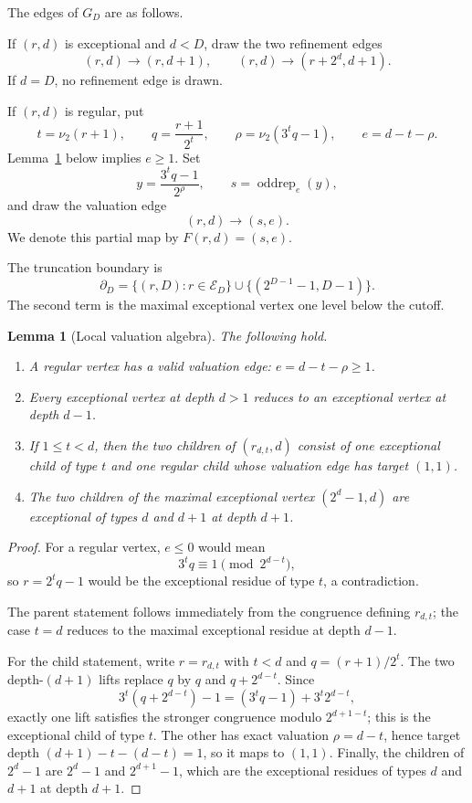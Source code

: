 \documentclass[11pt]{article}
\newtheorem{lemma}[theorem]{Lemma}
\theoremstyle{definition}
\theoremstyle{remark}
\newcommand{\nuu}{\nu_2}
\newcommand{\Ecal}{\mathcal E}
\newcommand{\bdD}{\partial_D}
\newcommand{\oddrep}{\operatorname{oddrep}}
\begin{document}
The edges of $G_D$ are as follows.

If $(r,d)$ is exceptional and $d<D$, draw the two refinement edges
\[
(r,d)\to(r,d+1),\qquad (r,d)\to(r+2^d,d+1).
\]
If $d=D$, no refinement edge is drawn.

If $(r,d)$ is regular, put
\[
t=\nuu(r+1),\qquad q=\frac{r+1}{2^t},\qquad
\rho=\nuu(3^tq-1),\qquad e=d-t-\rho.
\]
Lemma~\ref{lem:local} below implies $e\ge1$.  Set
\[
y=\frac{3^tq-1}{2^\rho},\qquad s=\oddrep_e(y),
\]
and draw the valuation edge
\[
(r,d)\to(s,e).
\]
We denote this partial map by $F(r,d)=(s,e)$.

The truncation boundary is
\[
\bdD=\{(r,D):r\in\Ecal_D\}\cup\{(2^{D-1}-1,D-1)\}.
\]
The second term is the maximal exceptional vertex one level below the cutoff.

\begin{lemma}[Local valuation algebra]\label{lem:local}
The following hold.
\begin{enumerate}
\item A regular vertex has a valid valuation edge: $e=d-t-\rho\ge1$.
\item Every exceptional vertex at depth $d>1$ reduces to an exceptional vertex at depth $d-1$.
\item If $1\le t<d$, then the two children of $(r_{d,t},d)$ consist of one exceptional child of type $t$ and one regular child whose valuation edge has target $(1,1)$.
\item The two children of the maximal exceptional vertex $(2^d-1,d)$ are exceptional of types $d$ and $d+1$ at depth $d+1$.
\end{enumerate}
\end{lemma}

\begin{proof}
For a regular vertex, $e\le0$ would mean
\[
3^tq\equiv1\pmod {2^{d-t}},
\]
so $r=2^tq-1$ would be the exceptional residue of type $t$, a contradiction.

The parent statement follows immediately from the congruence defining $r_{d,t}$; the case $t=d$ reduces to the maximal exceptional residue at depth $d-1$.

For the child statement, write $r=r_{d,t}$ with $t<d$ and $q=(r+1)/2^t$.  The two depth-$(d+1)$ lifts replace $q$ by $q$ and $q+2^{d-t}$.  Since
\[
3^t(q+2^{d-t})-1=(3^tq-1)+3^t2^{d-t},
\]
exactly one lift satisfies the stronger congruence modulo $2^{d+1-t}$; this is the exceptional child of type $t$.  The other has exact valuation $\rho=d-t$, hence target depth $(d+1)-t-(d-t)=1$, so it maps to $(1,1)$.  Finally, the children of $2^d-1$ are $2^d-1$ and $2^{d+1}-1$, which are the exceptional residues of types $d$ and $d+1$ at depth $d+1$.
\end{proof}
\end{document}
